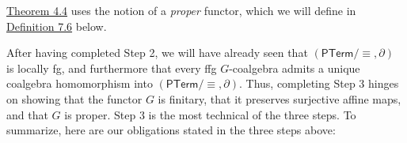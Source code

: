 \hypertarget{html:S4.SS0.SSSx3.p2}{} \hyperlink{html:S4.Thmtheorem4}{Theorem 4.4} uses the notion of a \emph{proper} functor, which we will define in \hyperlink{html:S7.Thmtheorem6}{Definition 7.6} below.
\par\medskip
\hypertarget{html:S4.SS0.SSSx3.p3}{} After having completed Step 2, we will have already seen that %
\hypertarget{html:S4.SS0.SSSx3.p3.m1}{}\({(\mathsf{PTerm}/{\equiv},\partial)}\) is locally fg, and furthermore that every ffg %
\hypertarget{html:S4.SS0.SSSx3.p3.m2}{}\({G}\)-coalgebra admits a unique coalgebra homomorphism into %
\hypertarget{html:S4.SS0.SSSx3.p3.m3}{}\({(\mathsf{PTerm}/{\equiv},\partial)}\). Thus, completing Step 3 hinges on showing that the functor %
\hypertarget{html:S4.SS0.SSSx3.p3.m4}{}\({G}\) is finitary, that it preserves surjective affine maps, and that %
\hypertarget{html:S4.SS0.SSSx3.p3.m5}{}\({G}\) is proper. Step 3 is the most technical of the three steps. \newline{}To summarize, here are our obligations stated in the three steps above:
\par\medskip
\hypertarget{html:S4.I1}{}
